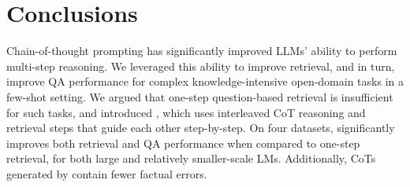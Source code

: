 \section{Conclusions}

Chain-of-thought prompting has significantly improved LLMs' ability to perform multi-step reasoning. We leveraged this ability to improve retrieval, and in turn, improve QA performance for complex knowledge-intensive open-domain tasks in a few-shot setting. We argued that one-step question-based retrieval is insufficient for such tasks, and introduced \iconsys, which uses interleaved CoT reasoning and retrieval steps that guide each other step-by-step. On four datasets, \iconsys significantly improves both retrieval and QA performance when compared to one-step retrieval, for both large and relatively smaller-scale LMs. Additionally, CoTs generated by \iconsys contain fewer factual errors.

